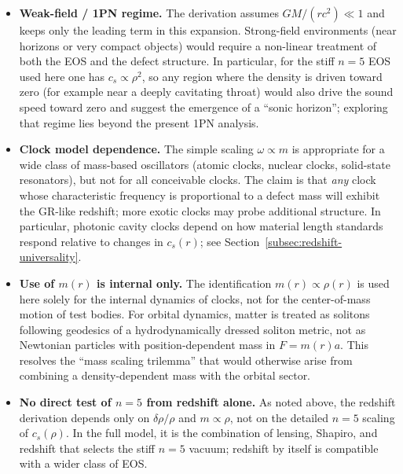 \documentclass[11pt]{article}
\begin{document}
\begin{itemize}
  \item \textbf{Weak-field / 1PN regime.}
        The derivation assumes $GM/(r c^2) \ll 1$ and keeps only the
        leading term in this expansion.
        Strong-field environments (near horizons or very compact objects)
        would require a non-linear treatment of both the EOS and the defect
        structure.
        In particular, for the stiff $n=5$ EOS used here one has
        $c_s \propto \rho^2$, so any region where the density is driven
        toward zero (for example near a deeply cavitating throat) would
        also drive the sound speed toward zero and suggest the emergence
        of a ``sonic horizon''; exploring that regime lies beyond the
        present 1PN analysis.

  \item \textbf{Clock model dependence.}
        The simple scaling $\omega \propto m$ is appropriate for a wide
        class of mass-based oscillators (atomic clocks, nuclear clocks,
        solid-state resonators), but not for all conceivable clocks.
        The claim is that \emph{any} clock whose characteristic frequency
        is proportional to a defect mass will exhibit the GR-like
        redshift; more exotic clocks may probe additional structure.
        In particular, photonic cavity clocks depend on how material length
        standards respond relative to changes in $c_s(r)$; see
        Section~\ref{subsec:redshift-universality}.

  \item \textbf{Use of $m(r)$ is internal only.}
        The identification $m(r) \propto \rho(r)$ is used here solely for
        the internal dynamics of clocks, not for the center-of-mass motion
        of test bodies.
        For orbital dynamics, matter is treated as solitons following
        geodesics of a hydrodynamically dressed soliton metric, not as
        Newtonian particles with position-dependent mass in $F = m(r)a$.
        This resolves the ``mass scaling trilemma'' that would otherwise
        arise from combining a density-dependent mass with the orbital
        sector.

  \item \textbf{No direct test of $n=5$ from redshift alone.}
        As noted above, the redshift derivation depends only on
        $\delta\rho/\rho$ and $m\propto\rho$, not on the detailed $n=5$
        scaling of $c_s(\rho)$.
        In the full model, it is the combination of lensing, Shapiro, and
        redshift that selects the stiff $n=5$ vacuum; redshift by itself
        is compatible with a wider class of EOS.
\end{itemize}
\end{document}
